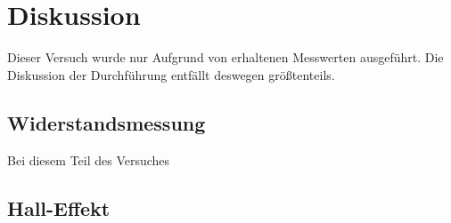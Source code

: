 \section{Diskussion}
Dieser Versuch wurde nur Aufgrund von erhaltenen Messwerten ausgeführt. Die Diskussion der Durchführung entfällt deswegen größtenteils.
\subsection{Widerstandsmessung}
Bei diesem Teil des Versuches 
\subsection{Hall-Effekt}